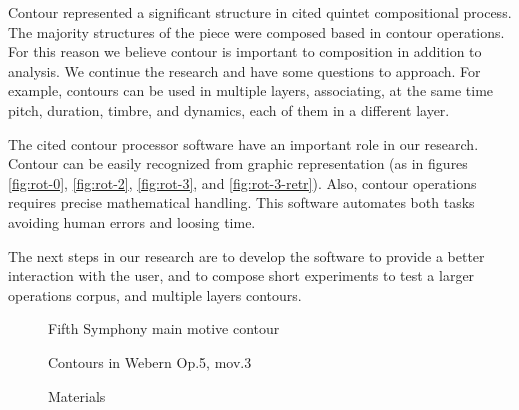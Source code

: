 Contour represented a significant structure in cited quintet
compositional process. The majority structures of the piece were
composed based in contour operations. For this reason we believe
contour is important to composition in addition to analysis. We
continue the research and have some questions to approach. For
example, contours can be used in multiple layers, associating, at the
same time pitch, duration, timbre, and dynamics, each of them in a
different layer.

The cited contour processor software have an important role in our
research. Contour can be easily recognized from graphic representation
(as in figures \ref{fig:rot-0}, \ref{fig:rot-2}, \ref{fig:rot-3}, and
\ref{fig:rot-3-retr}). Also, contour operations requires precise
mathematical handling. This software automates both tasks avoiding
human errors and loosing time.

The next steps in our research are to develop the software to provide
a better interaction with the user, and to compose short experiments
to test a larger operations corpus, and multiple layers contours.

\break

\begin{figure}[!p]
  \centering
  \subfloat[Contour (3 1 2 0)]{
    \texttt{[image: c-3120]}
    \label{fig:c-3120}
  }
  \caption{Fifth Symphony main motive contour}
  \label{fig:5a-sinfonia}
\end{figure}

\begin{figure}[!p]
  \centering

  \quad
  \caption{Contours in Webern Op.5, mov.3}
  \label{fig:exemplos-webern}
\end{figure}

\begin{figure}[!p]
  \centering
  \subfloat[P(5 3 4 1 2 0) contour]{
    \texttt{[image: c-534120]}
    \label{fig:c-534120}
  }
  \caption{Materials}
  \label{fig:materials}
\end{figure}

